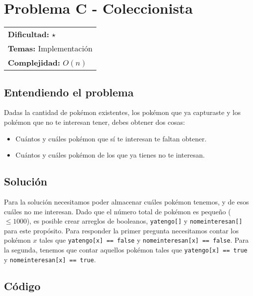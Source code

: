 \section{Problema C - Coleccionista}

\hfill
\begin{tabular}{@{}l@{}}
\textbf{Dificultad:} $\star$ \\
\textbf{Temas:} Implementación \\
\textbf{Complejidad:} $O(n)$
\end{tabular}

\subsection*{Entendiendo el problema}
Dadas la cantidad de pokémon existentes, los pokémon que ya capturaste y los pokémon que no te interesan tener, debes obtener dos cosas:
\begin{itemize}
\item Cuántos y cuáles pokémon que sí te interesan te faltan obtener.
\item Cuántos y cuáles pokémon de los que ya tienes no te interesan.
\end{itemize}
\subsection*{Solución}
Para la solución necesitamos poder almacenar cuáles pokémon tenemos, y de esos cuáles no me interesan. Dado que el número total de pokémon es pequeño ($\leq 1000$), es posible crear arreglos de booleanos, \texttt{yatengo[]} y \texttt{nomeinteresan[]} para este propósito. Para responder la primer pregunta necesitamos contar los pokémon $x$ tales que \texttt{yatengo[x] == false} y \texttt{nomeinteresan[x] == false}. Para la segunda, tenemos que contar aquellos pokémon tales que \texttt{yatengo[x] == true} y \texttt{nomeinteresan[x] == true}.
\subsection*{Código}

